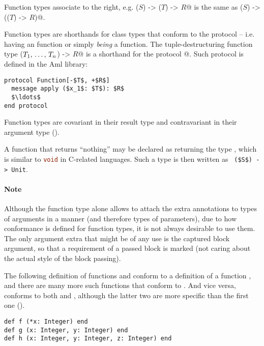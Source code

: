 Function types associate to the right, e.g. \lstinline@($S$) -> ($T$) -> $R$@ is the same as \lstinline@($S$) -> (($T$) -> $R$)@. 

Function types are shorthands for class types that conform to the \lstinline@Function@ protocol -- i.e. having an  function or simply {\em being} a function. The tuple-destructuring function type \lstinline@($T_1 ,\, \ldots ,\, T_n$) -> $R$@ is a shorthand for the protocol \lstinline@Function[$T_1 * \ldots * T_n,\,R$]@. Such protocol is defined in the Aml library:

\begin{lstlisting}
protocol Function[-$T$, +$R$]
  message apply ($x_1$: $T$): $R$
  $\ldots$
end protocol
\end{lstlisting}

Function types are covariant in their result type and contravariant in their argument type ().

A function that returns ``nothing'' may be declared as returning the type , which is similar to \lstinline[language=C]!void! in C-related languages. Such a type is then written as ~\lstinline!($S$) -> Unit!. 

\paragraph{Note}
Although the function type alone allows to attach the extra annotations to types of arguments in a  manner (and therefore types of parameters), due to how conformance is defined for function types, it is not always desirable to use them. The only argument extra that might be of any use is the captured block argument, so that a requirement of a passed block is marked (not caring about the actual style of the block passing). 

\example The following definition of functions  and  conform to a definition of a function , and there are many more such functions that conform to . And vice versa,  conforms to both  and , although the latter two are more specific than the first one (). 
\begin{lstlisting}
def f (*x: Integer) end
def g (x: Integer, y: Integer) end
def h (x: Integer, y: Integer, z: Integer) end
\end{lstlisting}





